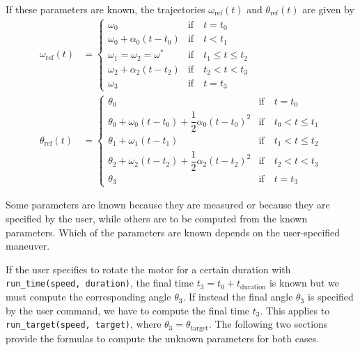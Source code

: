 \documentclass[12pt, a4paper]
{article}
\providecommand{\sub}[1]{_{\text{#1}}}
\providecommand{\w}{\omega}
\providecommand{\wt}{\w^*}
\providecommand{\wref}{\w\sub{ref}}
\renewcommand{\th}{\theta}
\providecommand{\thref}{\th\sub{ref}}
\renewcommand{\a}{\alpha}
\begin{document}
If these parameters are known, the trajectories $\wref(t)$ and $\thref(t)$ are
given by
%
\begin{align}
    \label{eq:wref}
    \wref(t)&=
    \begin{cases}
    \w_0 & \text{if} \quad t = t_0\\ 
    \w_0 + \a_0(t-t_0) & \text{if} \quad t < t_1\\
    \w_1=\w_2=\wt  & \text{if} \quad t_1 \leq t \leq t_2\\
    \w_2 + \a_2(t-t_2) & \text{if}\quad t_2 < t < t_3\\
    \w_3 & \text{if} \quad t = t_3
    \end{cases}\\[1em]
    \label{eq:thref}
    \thref(t)&=
    \begin{cases}
        \th_0 & \text{if} \quad t = t_0\\
        \th_0 + \w_0(t-t_0) + \dfrac{1}{2}\a_0(t-t_0)^2 &
            \text{if} \quad t_0 < t \leq t_1\\
        \th_1 + \w_1(t-t_1)  & \text{if} \quad t_1 < t \leq t_2\\
        \th_2 +\w_2(t-t_2)+\dfrac{1}{2}\a_2(t-t_2)^2 &
            \text{if}\quad t_2 < t < t_3\\
        \th_3 & \text{if} \quad t = t_3
    \end{cases}
\end{align}

Some parameters are known because they are measured or because they are
specified by the user, while others are to be computed from the known
parameters. Which of the parameters are known depends on the user-specified
maneuver.

If the user specifies to rotate the motor for a certain duration with
\texttt{run\_time(speed, duration)}, the final time $t_3=t_0+t\sub{duration}$
is known but we must compute the corresponding angle $\th_3$. If instead the
final angle $\th_3$ is specified by the user command, we have to compute the
final time $t_3$. This applies to \texttt{run\_target(speed, target)}, where
$\th_3=\th\sub{target}$. The following two sections provide the formulas to
compute the unknown parameters for both cases.
\end{document}
